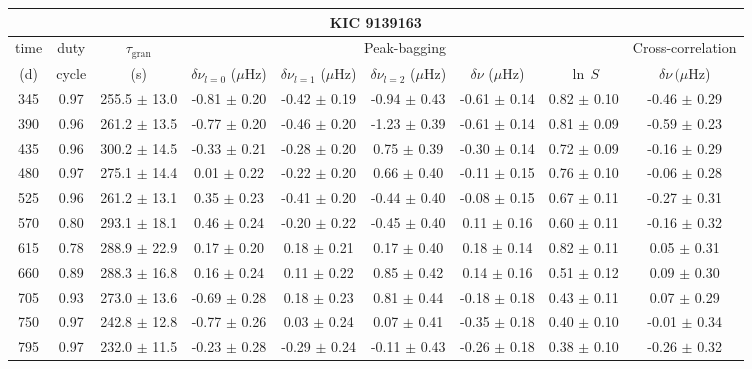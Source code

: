 \documentclass[twocolumn]{aastex61}%
\begin{document}
\begin{table*}[ht]\centering\fontsize{9.}{7.}\selectfont
\begin{tabular}{ccc|ccccc|c}
\multicolumn{9}{c}{KIC 9139163}\\ \hline\hline
time & duty & $\tau_\text{gran}$ &\multicolumn{5}{c|}{Peak-bagging}&Cross-correlation\\
(d)& cycle & (s)&$\delta\nu_{l=0}$ ($\mu$Hz) & $\delta\nu_{l=1}$ ($\mu$Hz) & $\delta\nu_{l=2}$ ($\mu$Hz) & $\delta\nu$ ($\mu$Hz)& $\ln\,S$ & $\delta\nu\,(\mu$Hz)\\\hline
345 & 0.97 & 255.5 $\pm$ 13.0 & -0.81 $\pm$ 0.20 & -0.42 $\pm$ 0.19 & -0.94 $\pm$ 0.43 & -0.61 $\pm$ 0.14 & 0.82 $\pm$ 0.10 & -0.46 $\pm$ 0.29\\
390 & 0.96 & 261.2 $\pm$ 13.5 & -0.77 $\pm$ 0.20 & -0.46 $\pm$ 0.20 & -1.23 $\pm$ 0.39 & -0.61 $\pm$ 0.14 & 0.81 $\pm$ 0.09 & -0.59 $\pm$ 0.23\\
435 & 0.96 & 300.2 $\pm$ 14.5 & -0.33 $\pm$ 0.21 & -0.28 $\pm$ 0.20 & 0.75 $\pm$ 0.39 & -0.30 $\pm$ 0.14 & 0.72 $\pm$ 0.09 & -0.16 $\pm$ 0.29\\
480 & 0.97 & 275.1 $\pm$ 14.4 & 0.01 $\pm$ 0.22 & -0.22 $\pm$ 0.20 & 0.66 $\pm$ 0.40 & -0.11 $\pm$ 0.15 & 0.76 $\pm$ 0.10 & -0.06 $\pm$ 0.28\\
525 & 0.96 & 261.2 $\pm$ 13.1 & 0.35 $\pm$ 0.23 & -0.41 $\pm$ 0.20 & -0.44 $\pm$ 0.40 & -0.08 $\pm$ 0.15 & 0.67 $\pm$ 0.11 & -0.27 $\pm$ 0.31\\
570 & 0.80 & 293.1 $\pm$ 18.1 & 0.46 $\pm$ 0.24 & -0.20 $\pm$ 0.22 & -0.45 $\pm$ 0.40 & 0.11 $\pm$ 0.16 & 0.60 $\pm$ 0.11 & -0.16 $\pm$ 0.32\\
615 & 0.78 & 288.9 $\pm$ 22.9 & 0.17 $\pm$ 0.20 & 0.18 $\pm$ 0.21 & 0.17 $\pm$ 0.40 & 0.18 $\pm$ 0.14 & 0.82 $\pm$ 0.11 & 0.05 $\pm$ 0.31\\
660 & 0.89 & 288.3 $\pm$ 16.8 & 0.16 $\pm$ 0.24 & 0.11 $\pm$ 0.22 & 0.85 $\pm$ 0.42 & 0.14 $\pm$ 0.16 & 0.51 $\pm$ 0.12 & 0.09 $\pm$ 0.30\\
705 & 0.93 & 273.0 $\pm$ 13.6 & -0.69 $\pm$ 0.28 & 0.18 $\pm$ 0.23 & 0.81 $\pm$ 0.44 & -0.18 $\pm$ 0.18 & 0.43 $\pm$ 0.11 & 0.07 $\pm$ 0.29\\
750 & 0.97 & 242.8 $\pm$ 12.8 & -0.77 $\pm$ 0.26 & 0.03 $\pm$ 0.24 & 0.07 $\pm$ 0.41 & -0.35 $\pm$ 0.18 & 0.40 $\pm$ 0.10 & -0.01 $\pm$ 0.34\\
795 & 0.97 & 232.0 $\pm$ 11.5 & -0.23 $\pm$ 0.28 & -0.29 $\pm$ 0.24 & -0.11 $\pm$ 0.43 & -0.26 $\pm$ 0.18 & 0.38 $\pm$ 0.10 & -0.26 $\pm$ 0.32\\

\end{tabular}
\end{table*}
\end{document}
